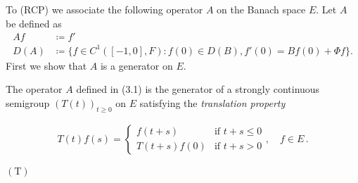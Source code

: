 To (RCP) we associate the following operator $A$ on the Banach space $E$.
Let $A$ be defined as
\begin{equation}\label{eq:b4-3.1}
	\begin{aligned}
		Af & \coloneq  f' \\
		D(A) & \coloneq  \{f \in C^1([-1,0],F) \colon f(0) \in D(B), f'(0) = Bf(0) + \Phi f\}.
	\end{aligned}
\end{equation}
First we show that $A$ is a generator on $E$.
\begin{theorem}\label{thm:b4-3.1}
	The operator $A$ defined in (3.1) is the generator of a strongly continuous semigroup $(T(t))_{t\geq 0}$ on $E$ satisfying the \emph{translation property}

\begin{minipage}{0.9\textwidth}
	\begin{equation*}
		\begin{aligned}
			T(t)f(s) = \begin{cases} 
				f(t+s) & \text{if } t+s \leq 0 \\
				T(t+s)f(0) & \text{if } t+s  >  0 
			\end{cases}, \quad f \in E\,.
		\end{aligned}
	\end{equation*}
\end{minipage}
\hfill
\begin{minipage}{0.05\textwidth}
	$\mathrm{(T)}$
\end{minipage}
\end{theorem}

